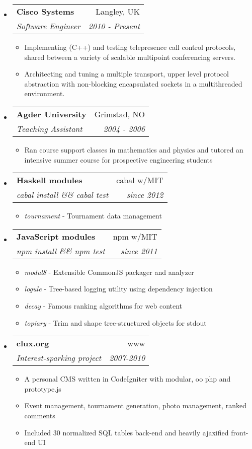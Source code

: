 \documentclass[letterpaper,11pt]{article}
\makeatletter
\newcommand{\resitem}[1]{\item #1 \vspace{-2pt}}
\newcommand{\resheading}[1]{\parbox{\textwidth}{\begin{shaded}\textbf{\sffamily{\mbox{~}{\large #1}\vphantom{p\^{E}}}}\end{shaded}}}
\newcommand{\ressubheading}[4]{
\begin{tabular*}{6.5in}{l@{\extracolsep{\fill}}r}
		\textbf{#1} & #2 \\
		\textit{#3} & \textit{#4} \\
\end{tabular*}\vspace{-6pt}}
\makeatother
\begin{document}
\resheading{Employment}
\begin{itemize}
  \item
    \ressubheading{Cisco Systems}{Langley, UK}{Software Engineer}{2010 - Present}
    \begin{itemize}
      \resitem{Implementing (C++) and testing telepresence call control protocols, shared between a variety of scalable multipoint conferencing servers.}
      \resitem{Architecting and tuning a multiple transport, upper level protocol abstraction with non-blocking encapsulated sockets in a multithreaded environment.}
    \end{itemize}
  \item
    \ressubheading{Agder University}{Grimstad, NO}{Teaching Assistant}{2004 - 2006}
    \begin{itemize}
      \resitem{Ran course support classes in mathematics and physics and tutored an intensive summer course for prospective engineering students}
    \end{itemize}
\end{itemize}

\resheading{Coding}
\begin{itemize}
  \item
    \ressubheading{Haskell modules}{cabal w/MIT}{cabal install \&\& cabal test}{since 2012}
    \begin{itemize}
      \resitem{\emph{tournament} - Tournament data management}
    \end{itemize}
  \item
    \ressubheading{JavaScript modules}{npm w/MIT}{npm install \&\& npm test}{since 2011}
    \begin{itemize}
      \resitem{\emph{modul8} - Extensible CommonJS packager and analyzer}
      \resitem{\emph{logule} - Tree-based logging utility using dependency injection}
      \resitem{\emph{decay} - Famous ranking algorithms for web content}
      \resitem{\emph{topiary} - Trim and shape tree-structured objects for stdout}
    \end{itemize}
  \item
    \ressubheading{clux.org}{www}{Interest-sparking project}{2007-2010}
    \begin{itemize}
      \resitem{A personal CMS written in CodeIgniter with modular, oo php and prototype.js}
      \resitem{Event management, tournament generation, photo management, ranked comments}
      \resitem{Included 30 normalized SQL tables back-end and heavily ajaxified front-end UI}
    \end{itemize}
\end{itemize}
\end{document}
